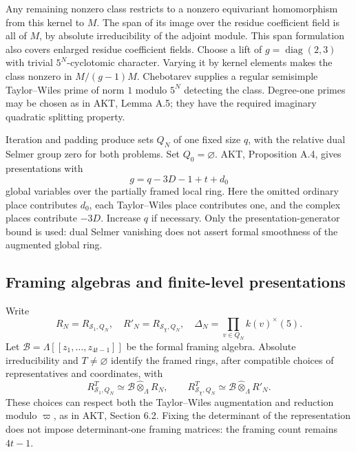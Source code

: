 \documentclass[11pt,a4paper]{article}
\theoremstyle{definition}\newtheorem{definition}[theorem]{Definition}
\theoremstyle{remark}\newtheorem*{remark}{Remark}
\newcommand{\diag}{\operatorname{diag}}\newcommand{\tr}{\operatorname{tr}}
\begin{document}
Any remaining nonzero class restricts to a nonzero equivariant homomorphism
from this kernel to $M$. The span of its image over the residue coefficient
field is all of $M$, by absolute irreducibility of the adjoint module. This
span formulation also covers enlarged residue coefficient fields. Choose a
lift of $g=\diag(2,3)$ with trivial $5^N$-cyclotomic character. Varying it by
kernel elements makes the class nonzero in $M/(g-1)M$. Chebotarev supplies a
regular semisimple Taylor--Wiles prime of norm $1$ modulo $5^N$ detecting the
class. Degree-one primes may be chosen as in AKT, Lemma A.5; they have the
required imaginary quadratic splitting property.

Iteration and padding produce sets $Q_N$ of one fixed size $q$, with the
relative dual Selmer group zero for both problems. Set $Q_0=\varnothing$.
AKT, Proposition A.4, gives presentations with
\begin{equation}\label{eq:generators}
g=q-3D-1+t+d_0
\end{equation}
global variables over the partially framed local ring. Here the omitted
ordinary place contributes $d_0$, each Taylor--Wiles place contributes one,
and the complex places contribute $-3D$. Increase $q$ if necessary. Only the
presentation-generator bound is used: dual Selmer vanishing does not assert
formal smoothness of the augmented global ring.

\subsection{Framing algebras and finite-level presentations}

Write
\[
R_N=R_{\mathcal S_1,Q_N},\quad R'_N=R_{\mathcal S_\chi,Q_N},\quad
\Delta_N=\prod_{v\in Q_N}k(v)^\times(5).
\]
Let $\mathcal B=\Lambda[[z_1,\ldots,z_{4t-1}]]$ be the formal framing
algebra. Absolute irreducibility and $T\ne\varnothing$ identify the framed
rings, after compatible choices of representatives and coordinates, with
\[
R_{\mathcal S_1,Q_N}^{T}\simeq
\mathcal B\widehat\otimes_\Lambda R_N,
\qquad
R_{\mathcal S_\chi,Q_N}^{T}\simeq
\mathcal B\widehat\otimes_\Lambda R'_N.
\]
These choices can respect both the Taylor--Wiles augmentation and reduction
modulo $\varpi$, as in AKT, Section 6.2. Fixing the determinant of the
representation does not impose determinant-one framing matrices: the framing
count remains $4t-1$.
\end{document}
